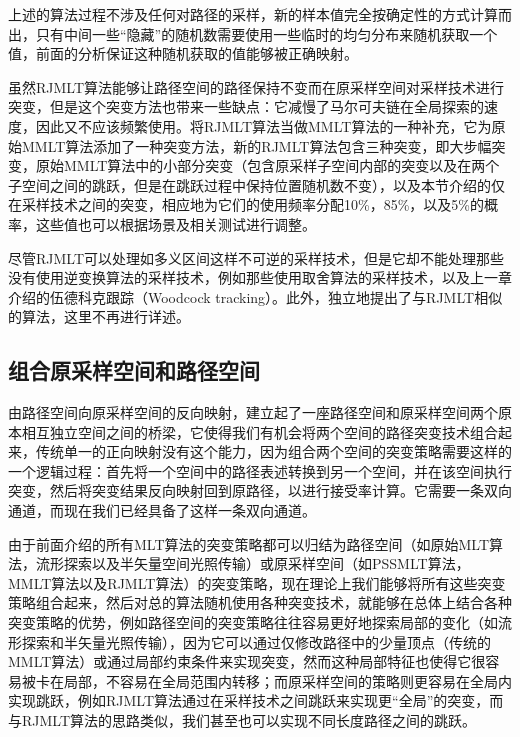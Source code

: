 上述的算法过程不涉及任何对路径的采样，新的样本值完全按确定性的方式计算而出，只有中间一些“隐藏”的随机数需要使用一些临时的均匀分布来随机获取一个值，前面的分析保证这种随机获取的值能够被正确映射。

虽然RJMLT算法能够让路径空间的路径保持不变而在原采样空间对采样技术进行突变，但是这个突变方法也带来一些缺点：它减慢了马尔可夫链在全局探索的速度，因此又不应该频繁使用。\cite{a:ReversibleJumpMetropolisLightTransportusingInverseMappings}将RJMLT算法当做MMLT算法的一种补充，它为原始MMLT算法添加了一种突变方法，新的RJMLT算法包含三种突变，即大步幅突变，原始MMLT算法中的小部分突变（包含原采样子空间内部的突变以及在两个子空间之间的跳跃，但是在跳跃过程中保持位置随机数不变），以及本节介绍的仅在采样技术之间的突变，相应地为它们的使用频率分配10\%，85\%，以及5\%的概率，这些值也可以根据场景及相关测试进行调整。

尽管RJMLT可以处理如多义区间这样不可逆的采样技术，但是它却不能处理那些没有使用逆变换算法的采样技术，例如那些使用取舍算法的采样技术，以及上一章介绍的伍德科克跟踪（Woodcock tracking）\cite{a:TechniquesusedintheGEMcodeforMonteCarloneu-tronicscalculationsinreactorsandothersystemsofcomplexgeometry}。此外，\cite{a:ChartedMetropolisLightTransport}独立地提出了与RJMLT相似的算法，这里不再进行详述。





\subsection{组合原采样空间和路径空间}
由路径空间向原采样空间的反向映射，建立起了一座路径空间和原采样空间两个原本相互独立空间之间的桥梁，它使得我们有机会将两个空间的路径突变技术组合起来，传统单一的正向映射没有这个能力，因为组合两个空间的突变策略需要这样的一个逻辑过程：首先将一个空间中的路径表述转换到另一个空间，并在该空间执行突变，然后将突变结果反向映射回到原路径，以进行接受率计算。它需要一条双向通道，而现在我们已经具备了这样一条双向通道。

由于前面介绍的所有MLT算法的突变策略都可以归结为路径空间（如原始MLT算法，流形探索以及半矢量空间光照传输）或原采样空间（如PSSMLT算法，MMLT算法以及RJMLT算法）的突变策略，现在理论上我们能够将所有这些突变策略组合起来，然后对总的算法随机使用各种突变技术，就能够在总体上结合各种突变策略的优势，例如路径空间的突变策略往往容易更好地探索局部的变化（如流形探索和半矢量光照传输），因为它可以通过仅修改路径中的少量顶点（传统的MMLT算法）或通过局部约束条件来实现突变，然而这种局部特征也使得它很容易被卡在局部，不容易在全局范围内转移；而原采样空间的策略则更容易在全局内实现跳跃，例如RJMLT算法通过在采样技术之间跳跃来实现更“全局”的突变，而与RJMLT算法的思路类似，我们甚至也可以实现不同长度路径之间的跳跃。

